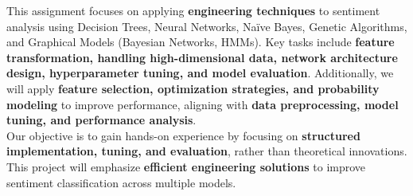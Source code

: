 This assignment focuses on applying \textbf{engineering techniques} to sentiment analysis using Decision Trees, Neural Networks, Naïve Bayes, Genetic Algorithms, and Graphical Models (Bayesian Networks, HMMs). Key tasks include \textbf{feature transformation, handling high-dimensional data, network architecture design, hyperparameter tuning, and model evaluation}. Additionally, we will apply \textbf{feature selection, optimization strategies, and probability modeling} to improve performance, aligning with \textbf{data preprocessing, model tuning, and performance analysis}.\\

Our objective is to gain hands-on experience by focusing on \textbf{structured implementation, tuning, and evaluation}, rather than theoretical innovations. This project will emphasize \textbf{efficient engineering solutions} to improve sentiment classification across multiple models.

\newpage
